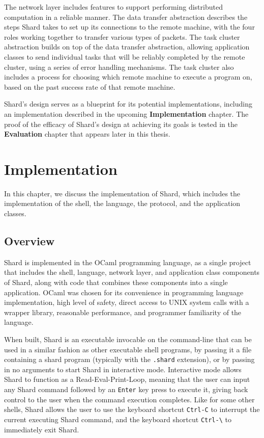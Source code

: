 \documentclass[twoside]{report}
\begin{document}
The network layer includes features to support performing distributed computation in a reliable manner.
The data transfer abstraction describes the steps Shard takes to set up its connections to the remote machine, with the four roles working together to transfer various types of packets.
The task cluster abstraction builds on top of the data transfer abstraction, allowing application classes to send individual tasks that will be reliably completed by the remote cluster, using a series of error handling mechanisms.
The task cluster also includes a process for choosing which remote machine to execute a program on, based on the past success rate of that remote machine.

Shard's design serves as a blueprint for its potential implementations, including an implementation described in the upcoming \textbf{Implementation} chapter.
The proof of the efficacy of Shard's design at achieving its goals is tested in the \textbf{Evaluation} chapter that appears later in this thesis.


\chapter{Implementation}

In this chapter, we discuss the implementation of Shard, which includes the implementation of the shell, the language, the protocol, and the application classes.

\section{Overview}

Shard is implemented in the OCaml programming language, as a single project that includes the shell, language, network layer, and application class components of Shard, along with code that combines these components into a single application.
OCaml was chosen for its convenience in programming language implementation, high level of safety, direct access to UNIX system calls with a wrapper library, reasonable performance, and programmer familiarity of the language.

When built, Shard is an executable invocable on the command-line that can be used in a similar fashion as other executable shell programs, by passing it a file containing a shard program (typically with the \texttt{.shard} extension), or by passing in no arguments to start Shard in interactive mode.
Interactive mode allows Shard to function as a Read-Eval-Print-Loop, meaning that the user can input any Shard command followed by an \texttt{Enter} key press to execute it, giving back control to the user when the command execution completes.
Like for some other shells, Shard allows the user to use the keyboard shortcut \texttt{Ctrl-C} to interrupt the current executing Shard command, and the keyboard shortcut \texttt{Ctrl-\textbackslash} to immediately exit Shard.
\end{document}
